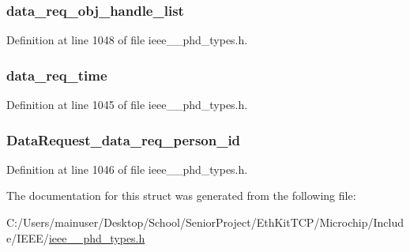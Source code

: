 \hypertarget{struct___data_request_a618e6c19f4f4ad8195774f4bd270d624}{}
\subsubsection[{data\+\_\+req\+\_\+obj\+\_\+handle\+\_\+list}]{ data\+\_\+req\+\_\+obj\+\_\+handle\+\_\+list}\label{struct___data_request_a618e6c19f4f4ad8195774f4bd270d624}


Definition at line 1048 of file ieee\+\_\+\_\+phd\+\_\+types.\+h.

\hypertarget{struct___data_request_a9eb6d0abd225e3b10c07461a6defebb3}{}
\subsubsection[{data\+\_\+req\+\_\+time}]{ data\+\_\+req\+\_\+time}\label{struct___data_request_a9eb6d0abd225e3b10c07461a6defebb3}


Definition at line 1045 of file ieee\+\_\+\_\+phd\+\_\+types.\+h.

\hypertarget{struct___data_request_a4eb9677e2a7609d240edeeab6c643b73}{}
\subsubsection[{Data\+Request\+\_\+data\+\_\+req\+\_\+person\+\_\+id}]{ Data\+Request\+\_\+data\+\_\+req\+\_\+person\+\_\+id}\label{struct___data_request_a4eb9677e2a7609d240edeeab6c643b73}


Definition at line 1046 of file ieee\+\_\+\_\+phd\+\_\+types.\+h.



The documentation for this struct was generated from the following file\+:\begin{DoxyCompactItemize}
\item 
C\+:/\+Users/mainuser/\+Desktop/\+School/\+Senior\+Project/\+Eth\+Kit\+T\+C\+P/\+Microchip/\+Include/\+I\+E\+E\+E/\hyperlink{ieee__11073__phd__types_8h}{ieee\+\_\+\_\+phd\+\_\+types.\+h}\end{DoxyCompactItemize}
